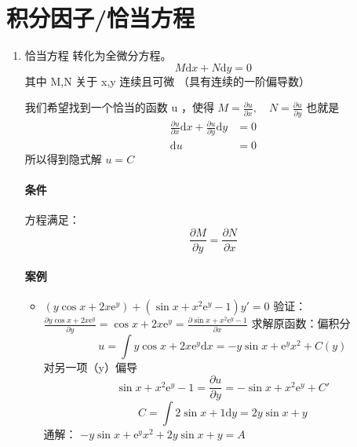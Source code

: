 \documentclass[11pt]{report}
\begin{document}
\section{积分因子/恰当方程}
\label{sec:orga35725b}
\begin{enumerate}
\item 恰当方程
\label{sec:orgbfd60e5}
转化为全微分方程。
\begin{equation}
\label{eq:17}
M\mathrm{d}x+N\mathrm{d}y=0
\end{equation}
其中 M,N 关于 x,y 连续且可微
（具有连续的一阶偏导数）

我们希望找到一个恰当的函数 u ，使得 \(M=\frac{\partial u}{\partial x},\quad N=\frac{\partial u}{\partial y}\)
也就是
\begin{equation}
\label{eq:21}
\begin{split}
\frac{\partial u}{\partial x}\mathrm{d}x+\frac{\partial u}{\partial y}\mathrm{d}y &=0\\
\mathrm{d}u&=0
\end{split}
\end{equation}
所以得到隐式解 \(u=C\)

\paragraph{条件}
方程满足：
$$\frac{\partial M}{\partial y}=\frac{\partial N}{\partial x}$$

\paragraph{案例}
\begin{itemize}
\item \((y\cos x+2x\mathrm{e}^{y})+(\sin x+x^2\mathrm{e}^{y}-1)y'=0\)
验证： \(\frac{\partial y\cos x+2x\mathrm{e}^{y}}{\partial y}=\cos x +2x\mathrm{e}^{y}=\frac{\partial \sin x+x^2\mathrm{e}^{y}-1}{\partial x}\)
求解原函数：偏积分
$$u=\int y\cos x+2x\mathrm{e}^{y} \mathrm{d}x=-y\sin x+\mathrm{e}^yx^2+C(y)$$
对另一项（y）偏导
$$\sin x+x^2\mathrm{e}^{y}-1=\frac{\partial u}{\partial y}=-\sin x+x^2\mathrm{e}^y+C'$$
$$C=\int 2\sin x+1 \mathrm{d}y=2y\sin x+y$$
通解： \(-y\sin x+\mathrm{e}^yx^2+2y\sin x+y=A\)
\end{itemize}


\end{enumerate}
\end{document}
